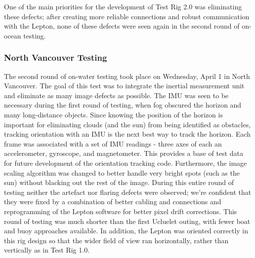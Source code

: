 One of the main priorities for the development of Test Rig 2.0 was eliminating these defects; after creating more reliable connections and robust communication with the Lepton, none of these defects were seen again in the second round of on-ocean testing.


\subsubsection{\label{sec:discussion:results:testrig2}North Vancouver Testing}

The second round of on-water testing took place on Wednesday, April 1 in North Vancouver. The goal of this test was to integrate the inertial measurement unit and eliminate as many image defects as possible. The IMU was seen to be necessary during the first round of testing, when fog obscured the horizon and many long-distance objects. Since knowing the position of the horizon is important for eliminating clouds (and the sun) from being identified as obstacles, tracking orientation with an IMU is the next best way to track the horizon. Each frame was associated with a set of IMU readings - three axes of each an accelerometer, gyroscope, and magnetometer. This provides a base of test data for future development of the orientation tracking code. Furthermore, the image scaling algorithm was changed to better handle very bright spots (such as the sun) without blacking out the rest of the image.  During this entire round of testing neither the artefact nor flaring defects were observed; we're confident that they were fixed by a combination of better cabling and connections and reprogramming of the Lepton software for better pixel drift corrections. This round of testing was much shorter than the first Ucluelet outing, with fewer boat and buoy approaches available. In addition, the Lepton was oriented correctly in this rig design so that the wider field of view ran horizontally, rather than vertically as in Test Rig 1.0.

